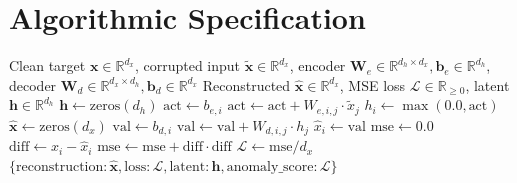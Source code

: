 \documentclass[11pt,a4paper]{article}
\theoremstyle{definition}
\begin{document}
\section{Algorithmic Specification}

\begin{algorithm}[H]
\caption{Denoising Autoencoder Forward Evaluation}
\label{alg:dae}
\begin{algorithmic}[1]
\Require Clean target $\mathbf{x} \in \mathbb{R}^{d_x}$, corrupted input $\tilde{\mathbf{x}} \in \mathbb{R}^{d_x}$, encoder $\mathbf{W}_e \in \mathbb{R}^{d_h \times d_x}, \mathbf{b}_e \in \mathbb{R}^{d_h}$, decoder $\mathbf{W}_d \in \mathbb{R}^{d_x \times d_h}, \mathbf{b}_d \in \mathbb{R}^{d_x}$
\Ensure Reconstructed $\hat{\mathbf{x}} \in \mathbb{R}^{d_x}$, MSE loss $\mathcal{L} \in \mathbb{R}_{\ge 0}$, latent $\mathbf{h} \in \mathbb{R}^{d_h}$
\State $\mathbf{h} \gets \text{zeros}(d_h)$
    \State $\text{act} \gets b_{e, i}$
        \State $\text{act} \gets \text{act} + W_{e, i, j} \cdot \tilde{x}_j$
    \EndFor
    \State $h_i \gets \max(0.0, \text{act})$ 
\EndFor
\State $\hat{\mathbf{x}} \gets \text{zeros}(d_x)$
    \State $\text{val} \gets b_{d, i}$
        \State $\text{val} \gets \text{val} + W_{d, i, j} \cdot h_j$
    \EndFor
    \State $\hat{x}_i \gets \text{val}$
\EndFor
\State $\text{mse} \gets 0.0$
    \State $\text{diff} \gets x_i - \hat{x}_i$
    \State $\text{mse} \gets \text{mse} + \text{diff} \cdot \text{diff}$
\EndFor
\State $\mathcal{L} \gets \text{mse} / d_x$
\State \Return $\{\text{reconstruction}: \hat{\mathbf{x}}, \text{loss}: \mathcal{L}, \text{latent}: \mathbf{h}, \text{anomaly\_score}: \mathcal{L}\}$
\end{algorithmic}
\end{algorithm}
\end{document}
